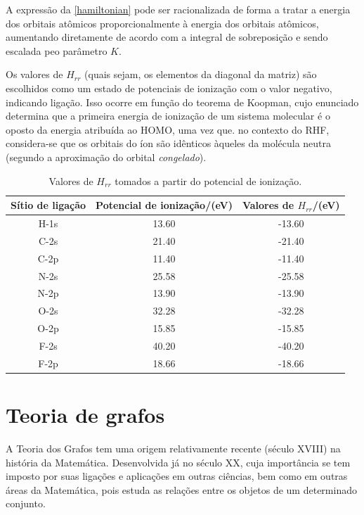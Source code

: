 A expressão da \autoref{hamiltonian} pode ser racionalizada de forma a tratar a energia dos orbitais atômicos proporcionalmente à energia dos orbitais atômicos, aumentando diretamente de acordo com a integral de sobreposição e sendo escalada peo parâmetro $K$.

 Os valores de $H_{rr}$ (quais sejam, os elementos da diagonal da matriz) são escolhidos como um estado de potenciais de ionização com o valor negativo, indicando ligação. Isso ocorre em função do teorema de Koopman\autocite{Koopmans1934}, cujo enunciado determina que a primeira energia de ionização de um sistema molecular é o oposto da energia atribuída ao \gls{HOMO}, uma vez que. no contexto do \gls{RHF}, considera-se que os orbitais do íon são idênticos àqueles da molécula neutra (segundo a aproximação do orbital \textit{congelado}). 

\begin{table}[htb]
	\centering
	\caption{\label{qua:Quadro_1} Valores de $H_{rr}$ tomados a partir do potencial de ionização.}	
	\begin{tabular}{ccc}
		\toprule
		\textbf{Sítio de ligação} & \textbf{Potencial de ionização/(eV)} & \textbf{Valores de $H_{rr}$/(eV)}
		\\ 
		\midrule
        H-1s & 13.60 & -13.60 \\
        C-2s & 21.40 & -21.40 \\
        C-2p & 11.40 & -11.40 \\
        N-2s & 25.58 & -25.58 \\
        N-2p & 13.90 & -13.90 \\
        O-2s & 32.28 & -32.28 \\
        O-2p & 15.85 & -15.85 \\
        F-2s & 40.20 & -40.20 \\
        F-2p & 18.66 & -18.66 \\
    \bottomrule
	\end{tabular}
\end{table}




\chapter{Teoria de grafos} \label{ap:graph}

A Teoria dos Grafos tem uma origem relativamente recente (século XVIII) na
história da Matemática. Desenvolvida já no século XX, cuja importância se tem
imposto por suas ligações e aplicações em outras ciências, bem como em outras
áreas da Matemática, pois estuda as relações entre os objetos de um determinado conjunto\autocite{neto2016topicos, soares2014introduccao}.

